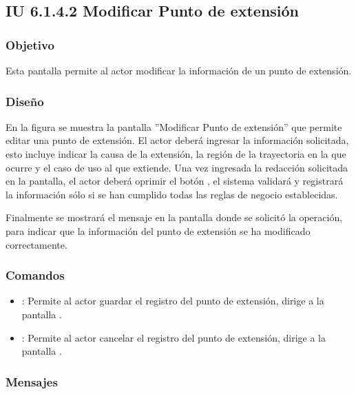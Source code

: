 \subsection{IU 6.1.4.2 Modificar Punto de extensión}

\subsubsection{Objetivo}
	Esta pantalla permite al actor modificar la información de un punto de extensión.
\subsubsection{Diseño}
	En la figura  se muestra la pantalla ''Modificar Punto de extensión'' que permite editar una punto de extensión. El actor deberá ingresar la información solicitada, esto incluye indicar la causa de la extensión, la región de la trayectoria en la que ocurre y el caso de uso al que extiende.
	Una vez ingresada la redacción solicitada en la pantalla, el actor deberá oprimir el botón , el sistema validará y registrará la información sólo si se han cumplido todas las reglas de negocio establecidas.
	
	Finalmente se mostrará el mensaje  en la pantalla donde se solicitó la operación, para indicar que la información del punto de extensión se ha modificado correctamente.

\subsubsection{Comandos}
\begin{itemize}
	\item {}: Permite al actor guardar el registro del punto de extensión, dirige a la pantalla .
	\item {}: Permite al actor cancelar el registro del punto de extensión, dirige a la pantalla .
\end{itemize}

\subsubsection{Mensajes}

